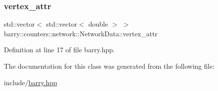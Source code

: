\subsubsection{\texorpdfstring{vertex\+\_\+attr}{vertex\_attr}}
{\footnotesize\ttfamily std\+::vector$<$ std\+::vector$<$ double $>$ $>$ barry\+::counters\+::network\+::\+Network\+Data\+::vertex\+\_\+attr}



Definition at line 17 of file barry.\+hpp.



The documentation for this class was generated from the following file\+:\begin{DoxyCompactItemize}
\item 
include/\hyperlink{barry_8hpp}{barry.\+hpp}\end{DoxyCompactItemize}
